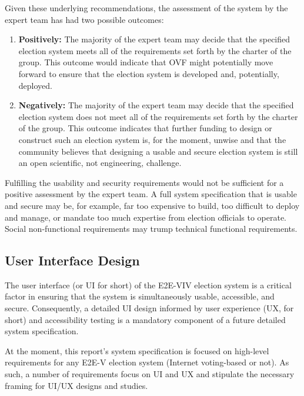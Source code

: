Given these underlying recommendations, the assessment of the system
by the expert team has had two possible outcomes:
\begin{enumerate}
\item \textbf{Positively:} The majority of the expert team may decide
  that the specified election system meets all of the requirements set
  forth by the charter of the group. This outcome would indicate that
  OVF might potentially move forward to ensure that the election
  system is developed and, potentially, deployed.
\item \textbf{Negatively:} The majority of the expert team may decide
  that the specified election system does not meet all of the
  requirements set forth by the charter of the group. This outcome
  indicates that further funding to design or construct such an
  election system is, for the moment, unwise and that the community
  believes that designing a usable and secure election system is still
  an open scientific, not engineering, challenge.
\end{enumerate}

Fulfilling the usability and security requirements would not be
sufficient for a positive assessment by the expert team. A full system
specification that is usable and secure may be, for example, far too
expensive to build, too difficult to deploy and manage, or mandate too
much expertise from election officials to operate. Social
non-functional requirements may trump technical functional
requirements.

\subsection{User Interface Design}
\label{sec:user-interf-design}

The user interface (or UI for short) of the E2E-VIV election system is
a critical factor in ensuring that the system is simultaneously
usable, accessible, and secure. Consequently, a detailed UI design
informed by user experience (UX, for short) and accessibility testing
is a mandatory component of a future detailed system specification.

At the moment, this report's system specification is focused on
high-level requirements for any E2E-V election system (Internet
voting-based or not).  As such, a number of requirements focus on UI
and UX and stipulate the necessary framing for UI/UX designs and
studies.

